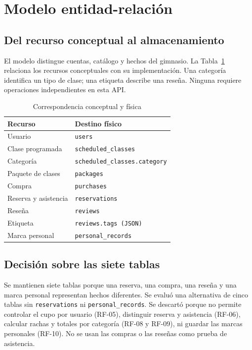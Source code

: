 \section{Modelo entidad-relación}\label{sec:modelo-laura}
\subsection{Del recurso conceptual al almacenamiento}
El modelo distingue cuentas, catálogo y hechos del gimnasio. La Tabla~\ref{tab:puente-laura} relaciona los recursos conceptuales con su implementación. Una categoría identifica un tipo de clase; una etiqueta describe una reseña. Ninguna requiere operaciones independientes en esta API.
\begin{table}[!t]\caption{Correspondencia conceptual y física}\label{tab:puente-laura}\centering\footnotesize
\begin{tabular}{p{}p{}}\toprule
Recurso & Destino físico \\ \midrule
Usuario & \texttt{users} \\
Clase programada & \texttt{scheduled\_\allowbreak{}classes} \\
Categoría & \texttt{scheduled\_\allowbreak{}classes.category} \\
Paquete de clases & \texttt{packages} \\
Compra & \texttt{purchases} \\
Reserva y asistencia & \texttt{reservations} \\
Reseña & \texttt{reviews} \\
Etiqueta & \texttt{reviews.tags (JSON)} \\
Marca personal & \texttt{personal\_\allowbreak{}records} \\\bottomrule\end{tabular}\end{table}
\subsection{Decisión sobre las siete tablas}
Se mantienen siete tablas porque una reserva, una compra, una reseña y una marca personal representan hechos diferentes. Se evaluó una alternativa de cinco tablas sin \texttt{reservations} ni \texttt{personal\_records}. Se descartó porque no permite controlar el cupo por usuario (RF-05), distinguir reserva y asistencia (RF-06), calcular rachas y totales por categoría (RF-08 y RF-09), ni guardar las marcas personales (RF-10). No se usan las compras o las reseñas como prueba de asistencia.

